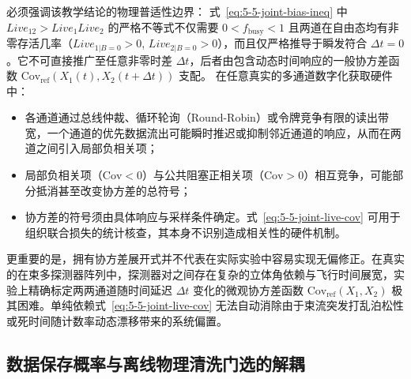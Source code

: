 必须强调该教学结论的物理普适性边界：
式~\eqref{eq:5-5-joint-bias-ineq} 中 $Live_{12} > Live_1 Live_2$ 的严格不等式不仅需要 $0 < f_{\mathrm{busy}} < 1$ 且两道在自由态均有非零存活几率（\allowbreak{}$Live_{1|B=0} > 0$, \allowbreak{}$Live_{2|B=0} > 0$），而且仅严格推导于瞬发符合 $\Delta t = 0$。它不可直接推广至任意非零时差 $\Delta t$，后者由包含动态时间响应的一般协方差函数 $\mathrm{Cov}_{\mathrm{ref}}(X_1(t), X_2(t+\Delta t))$ 支配。
在任意真实的多通道数字化获取硬件中：
\begin{itemize}
\item 各通道通过总线仲裁、循环轮询（Round-Robin）或令牌竞争有限的读出带宽，一个通道的优先数据流出可能瞬时推迟或抑制邻近通道的响应，从而在两道之间引入局部负相关项；
\item 局部负相关项（$\mathrm{Cov} < 0$）与公共阻塞正相关项（$\mathrm{Cov} > 0$）相互竞争，可能部分抵消甚至改变协方差的总符号；
\item 协方差的符号须由具体响应与采样条件确定。式~\eqref{eq:5-5-joint-live-cov} 可用于组织联合损失的统计核查，其本身不识别造成相关性的硬件机制。
\end{itemize}

更重要的是，拥有协方差展开式并不代表在实际实验中容易实现无偏修正。在真实的在束多探测器阵列中，探测器对之间存在复杂的立体角依赖与飞行时间展宽，实验上精确标定两两通道随时间延迟 $\Delta t$ 变化的微观协方差函数 $\mathrm{Cov}_{\mathrm{ref}}(X_1, X_2)$ 极其困难。单纯依赖式~\eqref{eq:5-5-joint-live-cov} 无法自动消除由于束流突发打乱泊松性或死时间随计数率动态漂移带来的系统偏置。

\subsection{数据保存概率与离线物理清洗门选的解耦}\label{subsec:5-5-5}

